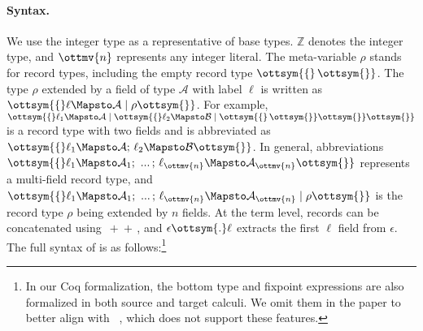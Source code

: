 \paragraph{Syntax.}
We use the integer type as a representative of base types. $ \mathbb{Z} $ denotes
the integer type, and $\ottmv{n}$ represents any integer literal. The meta-variable
$\rho$ stands for record types, including the empty record type $\ottsym{\{}  \,  \ottsym{\}}$. The
type $\rho$ extended by a field of type $\mathcal{A}$ with label $\ell$ is written
as $\ottsym{\{}  \ell  \Mapsto  \mathcal{A}  \mid  \rho  \ottsym{\}}$. For example, $\ottsym{\{}  \ell_{{\mathrm{1}}}  \Mapsto  \mathcal{A}  \mid  \ottsym{\{}  \ell_{{\mathrm{2}}}  \Mapsto  \mathcal{B}  \mid  \ottsym{\{}  \,  \ottsym{\}}  \ottsym{\}}  \ottsym{\}}$ is a
record type with two fields and is abbreviated as $\ottsym{\{}  \ell_{{\mathrm{1}}}  \Mapsto  \mathcal{A}  ; \,  \ell_{{\mathrm{2}}}  \Mapsto  \mathcal{B}  \ottsym{\}}$.
In general, abbreviations $\ottsym{\{}  \ell_{{\mathrm{1}}}  \Mapsto  \mathcal{A}_{{\mathrm{1}}}  ; \, \, ... \, ; \,  \ell_{\ottmv{n}}  \Mapsto  \mathcal{A}_{\ottmv{n}}  \ottsym{\}}$ represents a
multi-field record type, and $\ottsym{\{}  \ell_{{\mathrm{1}}}  \Mapsto  \mathcal{A}_{{\mathrm{1}}}  ; \, \, ... \, ; \,  \ell_{\ottmv{n}}  \Mapsto  \mathcal{A}_{\ottmv{n}}  \mid  \rho  \ottsym{\}}$ is
the record type $\rho$ being extended by $n$ fields. At the term level, records
can be concatenated using $ \,{+}\!{+}\, $, and $\epsilon  \ottsym{.}  \ell$ extracts the first $\ell$
field from $\epsilon$. The full syntax of \lambdar is as follows:\footnote{In our
Coq formalization, the bottom type and fixpoint expressions are also formalized
in both source and target calculi. We omit them in the paper to better align
with \lambdaiplus~\citep{bi2018essence}, which does not support these features.}

